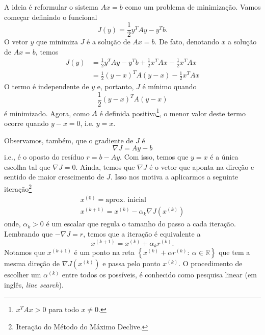 A ideia é reformular o sistema $Ax = b$ como um problema de minimização. Vamos começar definindo o funcional
\begin{equation}\label{eq:funcional_mg}
  J(y) = \frac{1}{2}y^TAy - y^Tb.
\end{equation}
O vetor $y$ que minimiza $J$ é a solução de $Ax = b$. De fato, denotando $x$ a solução de $Ax = b$, temos
\begin{align}
  J(y) &= \frac{1}{2}y^TAy - y^Tb + \frac{1}{2}x^TAx - \frac{1}{2}x^TAx\\
       &= \frac{1}{2}(y-x)^TA(y-x) - \frac{1}{2}x^TAx
\end{align}
O termo é independente de $y$ e, portanto, $J$ é mínimo quando
\begin{equation}
  \frac{1}{2}(y-x)^TA(y-x)
\end{equation}
é minimizado. Agora, como $A$ é definida positiva\footnote{$x^TAx > 0$ para todo $x\neq 0$.}, o menor valor deste termo ocorre quando $y-x = 0$, i.e. $y=x$.

Observamos, também, que o gradiente de $J$ é
\begin{equation}
  \nabla J = Ay - b
\end{equation}
i.e., é o oposto do resíduo $r = b - Ay$. Com isso, temos que $y = x$ é a única escolha tal que $\nabla J = 0$. Ainda, temos que $\nabla J$ é o vetor que aponta na direção e sentido de maior crescimento de $J$. Isso nos motiva a aplicarmos a seguinte iteração\footnote{Iteração do Método do Máximo Declive.}
\begin{gather}
  x^{(0)} = \text{aprox. inicial}\\
  x^{(k+1)} = x^{(k)} - \alpha_k\nabla J\left(x^{(k)}\right)
\end{gather}
onde, $\alpha_k>0$ é um escalar que regula o tamanho do passo a cada iteração. Lembrando que $-\nabla J = r$, temos que a iteração é equivalente a
\begin{equation}
  x^{(k+1)} = x^{(k)} + \alpha_kr^{(k)}.
\end{equation}
Notamos que $x^{(k+1)}$ é um ponto na reta $\left\{x^{(k)} + \alpha r^{(k)}:~\alpha\in\mathbb{R}\right\}$ que tem a mesma direção de $\nabla J\left(x^{(k)}\right)$ e passa pelo ponto $x^{(k)}$. O procedimento de escolher um $\alpha^{(k)}$ entre todos os possíveis, é conhecido como pesquisa linear (em inglês, {\it line search}).

